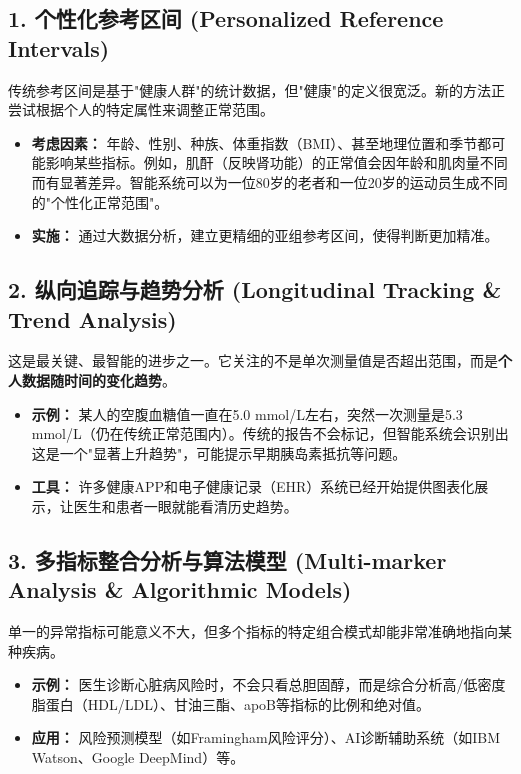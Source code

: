 \documentclass[a4paper, oneside, 12pt]{article}
\begin{document}
\begin{aireport}
{    \subsection*{1. 个性化参考区间 (Personalized Reference Intervals)}
    传统参考区间是基于"健康人群"的统计数据，但"健康"的定义很宽泛。新的方法正尝试根据个人的特定属性来调整正常范围。
    \begin{itemize}
        \item \textbf{考虑因素：} 年龄、性别、种族、体重指数（BMI）、甚至地理位置和季节都可能影响某些指标。例如，肌酐（反映肾功能）的正常值会因年龄和肌肉量不同而有显著差异。智能系统可以为一位80岁的老者和一位20岁的运动员生成不同的"个性化正常范围"。
        \item \textbf{实施：} 通过大数据分析，建立更精细的亚组参考区间，使得判断更加精准。
    \end{itemize}

    \subsection*{2. 纵向追踪与趋势分析 (Longitudinal Tracking \& Trend Analysis)}
    这是最关键、最智能的进步之一。它关注的不是单次测量值是否超出范围，而是\textbf{个人数据随时间的变化趋势}。
    \begin{itemize}
        \item \textbf{示例：} 某人的空腹血糖值一直在5.0 mmol/L左右，突然一次测量是5.3 mmol/L（仍在传统正常范围内）。传统的报告不会标记，但智能系统会识别出这是一个"显著上升趋势"，可能提示早期胰岛素抵抗等问题。
        \item \textbf{工具：} 许多健康APP和电子健康记录（EHR）系统已经开始提供图表化展示，让医生和患者一眼就能看清历史趋势。
    \end{itemize}

    \subsection*{3. 多指标整合分析与算法模型 (Multi-marker Analysis \& Algorithmic Models)}
    单一的异常指标可能意义不大，但多个指标的特定组合模式却能非常准确地指向某种疾病。
    \begin{itemize}
        \item \textbf{示例：} 医生诊断心脏病风险时，不会只看总胆固醇，而是综合分析高/低密度脂蛋白（HDL/LDL）、甘油三酯、apoB等指标的比例和绝对值。
        \item \textbf{应用：} 风险预测模型（如Framingham风险评分）、AI诊断辅助系统（如IBM Watson、Google DeepMind）等。
    \end{itemize}

}
\end{aireport}
\end{document}
